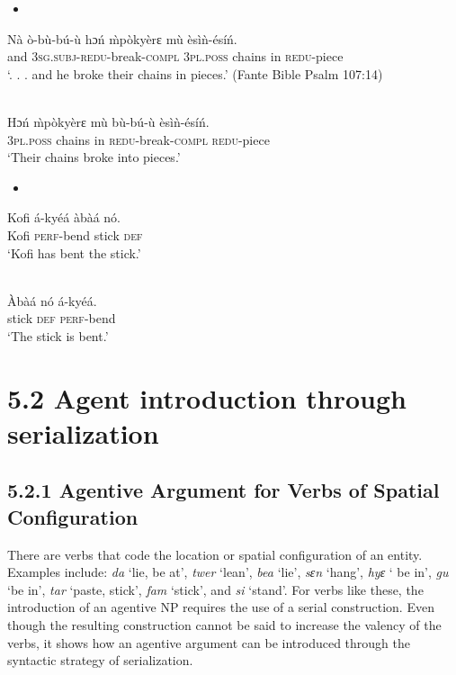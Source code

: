 \documentclass[output=paper]{langsci/langscibook}
\begin{document}
\begin{itemize}
\item \ea\label{ex:}
\\
\end{itemize}
\gll N\`{a}  \`{o}-b\`{u}-b\'{u}-\`{u}      hɔ\'{n}    \`{m}p\`{o}ky\`{e}rɛ  m\`{u}   \`{e}s\`{i}\`{n}-\'{e}s\'{i}\'{n}.\\
     and  \textsc{3sg.subj}{}-\textsc{redu}{}-break-\textsc{compl}  \textsc{3pl.poss}  chains    in  \textsc{redu}{}-piece\\
\glt ‘. . . and he broke their chains in pieces.’ (Fante Bible Psalm 107:14)
\z

\ea\label{ex:}
\\
\gll Hɔ\'{n}  \`{m}p\`{o}ky\`{e}rɛ   m\`{u}  b\`{u}-b\'{u}-\`{u}     \`{e}s\`{i}\`{n}-\'{e}s\'{i}\'{n}.\\
     \textsc{3pl.poss}  chains    in  \textsc{redu}{}-break-\textsc{compl}  \textsc{redu}{}-piece\\
\glt ‘Their chains broke into pieces.’
\z

\begin{itemize}
\item \ea\label{ex:}
\\
\end{itemize}
\gll Kofi  \'{a}-ky\'{e}\'{a}    \`{a}b\`{a}\'{a}  n\'{o}.\\
     Kofi  \textsc{perf}{}-bend  stick  \textsc{def}\\
\glt ‘Kofi has bent the stick.’
\z

\ea\label{ex:}
\\
\gll \`{A}b\`{a}\'{a}  n\'{o}  \'{a}-ky\'{e}\'{a}.\\
     stick  \textsc{def}  \textsc{perf}{}-bend\\
\glt ‘The stick is bent.’
\z

\section{5.2  Agent introduction through serialization}
\subsection{5.2.1  Agentive Argument for Verbs of Spatial Configuration}

There are verbs that code the location or spatial configuration of an entity. Examples  include: \emph{da} ‘lie, be at’, \emph{twer} ‘lean’, \emph{bea} ‘lie’, \emph{sɛn} ‘hang’, \emph{hyɛ} ‘ be in’, \emph{gu} ‘be in’, \emph{tar} ‘paste, stick’, \emph{fam} ‘stick’, and \emph{si} ‘stand’. For verbs like these, the introduction of an agentive NP requires the use of a serial construction. Even though the resulting construction cannot be said to increase the valency of the verbs, it shows how an agentive argument can be introduced through the syntactic strategy of serialization.
\end{document}

